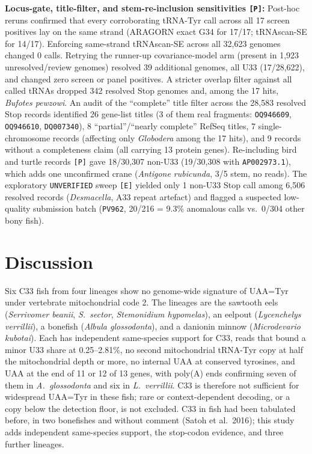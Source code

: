 \documentclass[11pt, a4paper]{article}
\begin{document}
\textbf{Locus-gate, title-filter, and stem-re-inclusion sensitivities \texttt{[P]}:} Post-hoc reruns confirmed that every corroborating tRNA-Tyr call across all 17 screen positives lay on the same strand (ARAGORN exact G34 for 17/17; tRNAscan-SE for 14/17). Enforcing same-strand tRNAscan-SE across all 32,623 genomes changed 0 calls. Retrying the runner-up covariance-model arm (present in 1,923 unresolved/review genomes) resolved 39 additional genomes, all U33 (17/28,622), and changed zero screen or panel positives. A stricter overlap filter against all called tRNAs dropped 342 resolved Stop genomes and, among the 17 hits, \textit{Bufotes pewzowi}. An audit of the ``complete'' title filter across the 28,583 resolved Stop records identified 26 gene-list titles (3 of them real fragments: \texttt{OQ946609}, \texttt{OQ946610}, \texttt{DQ007340}), 8 ``partial''/``nearly complete'' RefSeq titles, 7 single-chromosome records (affecting only \textit{Globodera} among the 17 hits), and 9 records without a completeness claim (all carrying 13 protein genes). Re-including bird and turtle  records \texttt{[P]} gave 18/30,307 non-U33 (19/30,308 with \texttt{AP002973.1}), which adds one unconfirmed crane (\textit{Antigone rubicunda}, 3/5 stem, no reads). The exploratory \texttt{UNVERIFIED} sweep \texttt{[E]} yielded only 1 non-U33 Stop call among 6,506 resolved records (\textit{Desmacella}, A33 repeat artefact) and flagged a suspected low-quality submission batch (\texttt{PV962}, 20/216 = 9.3\% anomalous calls vs.\ 0/304 other bony fish).

\section{Discussion}
Six C33 fish from four lineages show no genome-wide signature of UAA=Tyr under vertebrate mitochondrial code 2. The lineages are the sawtooth eels (\textit{Serrivomer beanii}, \textit{S.\ sector}, \textit{Stemonidium hypomelas}), an eelpout (\textit{Lycenchelys verrillii}), a bonefish (\textit{Albula glossodonta}), and a danionin minnow (\textit{Microdevario kubotai}). Each has independent same-species support for C33, reads that bound a minor U33 share at 0.25--2.81\%, no second mitochondrial tRNA-Tyr copy at half the mitochondrial depth or more, no internal UAA at conserved tyrosines, and UAA at the end of 11 or 12 of 13 genes, with poly(A) ends confirming seven of them in \textit{A.\ glossodonta} and six in \textit{L.\ verrillii}. C33 is therefore not sufficient for widespread UAA=Tyr in these fish; rare or context-dependent decoding, or a copy below the detection floor, is not excluded. C33 in fish had been tabulated before, in two bonefishes and without comment (Satoh et al.\ 2016); this study adds independent same-species support, the stop-codon evidence, and three further lineages. 
\end{document}
